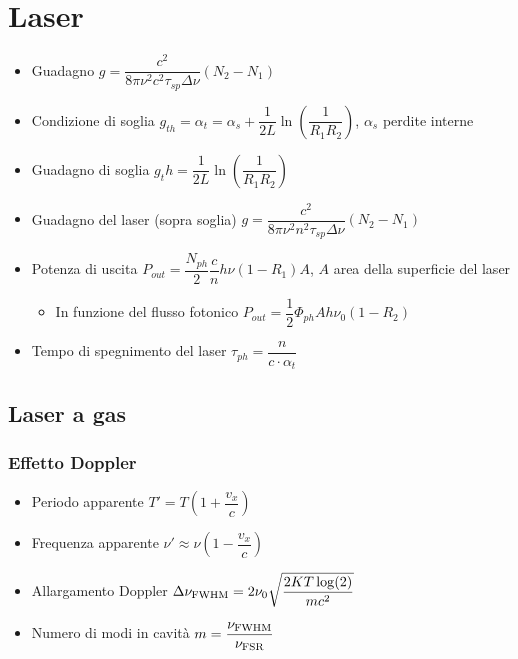 \documentclass{article}
\begin{document}
\newpage

\section{Laser}
\begin{itemize}
  \item Guadagno \( g = \dfrac{c^2}{8 \pi \nu^2 c^2 \tau_{sp} \Delta \nu} (N_2 - N_1) \)
  \item Condizione di soglia \( g_{th} = \alpha_t = \alpha_s + \dfrac{1}{2L} \ln\left(\dfrac{1}{R_1 R_2}\right) \), \( \alpha_s \) perdite interne
  \item Guadagno di soglia \( g_th = \dfrac{1}{2L} \ln\left(\dfrac{1}{R_1 R_2}\right)\)
  \item Guadagno del laser (sopra soglia) \( g = \dfrac{c^2}{8 \pi \nu^2 n ^ 2 \tau_{sp} \Delta \nu} (N_2 - N_1) \)
  \item Potenza di uscita \( P_{out} = \dfrac{N_{ph}}{2} \dfrac{c}{n} h \nu (1 - R_1) A \), \( A \) area della superficie del laser
        \begin{itemize}
          \item In funzione del flusso fotonico \( P_{out} = \dfrac{1}{2} \Phi_{ph} A h \nu_0 ( 1 - R_2) \)
        \end{itemize}
  \item Tempo di spegnimento del laser \( \tau_{ph} = \dfrac{n}{c \cdot \alpha_t} \)
\end{itemize}

\subsection{Laser a gas}
\subsubsection{Effetto Doppler}
\begin{itemize}
  \item Periodo apparente \( T ' = T \left( 1 + \dfrac{v_x}{c} \right) \)
  \item Frequenza apparente \( \nu ' \approx \nu \left(1 - \dfrac{v_x}{c} \right) \)
  \item Allargamento Doppler \( \Delta \nu_{\textnormal{FWHM}} = 2 \nu_0 \sqrt{\dfrac{2 K T \log(2)}{m c ^ 2}} \)
  \item Numero di modi in cavità \(m = \dfrac{ \nu_{\textnormal{FWHM}}}{ \nu_{\textnormal{FSR}}} \)
\end{itemize}
\end{document}
